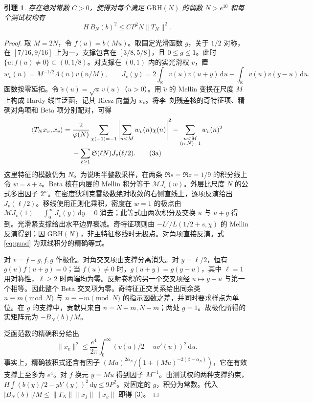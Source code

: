 \documentclass[UTF8,a4paper,11pt,fontset=windows]{ctexart}
\newtheorem{lemma}[theorem]{引理}
\newcommand{\Sg}{\mathfrak S}
\newcommand{\RR}{\mathbb R}
\newcommand{\Lam}{\Lambda}
\newcommand{\dd}{\,\mathrm d}
\newcommand{\GRH}{\mathrm{GRH}}
\begin{document}
\begin{lemma}\label{le:transfer}
存在绝对常数 \(C>0\)，使得对每个满足 \(\GRH(N)\) 的偶数 \(N>e^{10}\) 和每个测试权均有
\[
                     H\,B_N(b)^2\le C P^2 N\|T_N\|^2.         \tag{3}
\]
\end{lemma}
\begin{proof}
取 \(M=2N\)，令 \(f(u)=b(Mu)\)。取固定光滑函数 \(g\)，关于 \(1/2\) 对称，在 \([7/16,9/16]\) 上为一，支撑包含在 \([3/8,5/8]\)，且 \(0\le g\le1\)。此时 \(\{u:f(u)\ne0\}\subset (0,1/8)\)。对支撑在 \((0,1)\) 内的实光滑权 \(v\)，置
\[
 w_v(n)=M^{-1/2}\Lam(n)v(n/M),\qquad
 J_v(y)=2\int_{\RR}v(u)v(u+y)\dd u-\int_{\RR}v(u)v(y-u)\dd u .
\]
函数按零延拓。令 \(\widetilde v(u)=\sqrt u\,v(u)\)（\(u>0\)）。用 \(\widetilde v\) 的 Mellin 变换在尺度 \(M\) 上构成 Hardy 线性泛函，记其 Riesz 向量为 \(x_v\)。将李--刘残差核的奇特征项、精确对角项和 Beta 项分别配对，可得
\begin{align}
 \langle T_N x_v,x_v\rangle
 ={}&\frac{2}{\varphi(N)}\sum_{\chi(-1)=-1}
     \left|\sum_{n<M}w_v(n)\chi(n)\right|^2
       -\sum_{\substack{n<M\\(n,N)=1}}w_v(n)^2 \notag\\[-2pt]
    &-\sum_{\ell\ge1}\Sg(\ell N)J_v(\ell/2).                  \tag{3a}\label{eq:quad}
\end{align}
这里特征的模数仍为 \(N\)。为说明半整数采样，在两条 \(\Re s=\Re z=1/9\) 的积分线上令 \(w=s+z\)。Beta 核在内层的 Mellin 积分等于 \(\mathcal M J_v(w)\)。外层比尺度 \(N\) 的公式多出因子 \(2^w\)。在密度狄利克雷级数绝对收敛的右侧直线上，逐项反演给出 \(J_v(\ell/2)\)。移线使用正则化乘积，密度在 \(w=1\) 的极点由
\(\mathcal M J_v(1)=\int_0^\infty J_v(y)\dd y=0\) 消去；此等式由两次积分及交换 \(u\) 与 \(u+y\) 得到。光滑紧支撑给出水平边界衰减。奇特征项则由 \(-L'/L(1/2+s,\chi)\) 的 Mellin 反演得到；因 \(\GRH(N)\)，非主特征移线时无极点。对角项直接反演。式 \eqref{eq:quad} 为双线积分的精确等式。

对 \(v=f+g,f,g\) 作极化。对角交叉项由支撑分离消失。对 \(y=\ell/2\)，恒有 \(g(u)f(u+y)=0\)；当 \(f(u)\ne0\) 时，\(g(u+y)=g(y-u)\)，其中 \(\ell=1\) 用对称性，\(\ell\ge2\) 时两端均为零。反射卷积的另一个交叉项经 \(u\mapsto y-u\) 与第一个相等。因此整个 Beta 交叉项为零。奇特征正交关系给出同余类 \(n\equiv m\pmod N\) 与 \(n\equiv-m\pmod N\) 的指示函数之差，并同时要求样点为单位。在 \(g\) 的支撑中，贡献只来自 \(n=N+m,N-m\)；两处 \(g=1\)。故极化所得的实矩阵元为 \(-B_N(b)/M\)。

泛函范数的精确积分给出
\[
 \|x_v\|^2\le\frac{e^4}{2\pi}
       \int_0^\infty\left(v(u)/2-u v'(u)\right)^2\dd u .
\]
事实上，精确被积式还含有因子
\((Mu)^{2\alpha_N}/(1+(Mu)^{-2(\beta-\alpha_N)})\)，它在有效支撑上至多为 \(e^4\)。对 \(f\) 换元 \(y=Mu\) 得到因子 \(M^{-1}\)。由测试权的两种支撑约束，\(H\int (b(y)/2-yb'(y))^2\dd y\le 9P^2\)。对固定的 \(g\)，积分为常数。代入
\(|B_N(b)|/M\le\|T_N\|\|x_f\|\|x_g\|\) 即得 (3)。
\end{proof}
\end{document}

